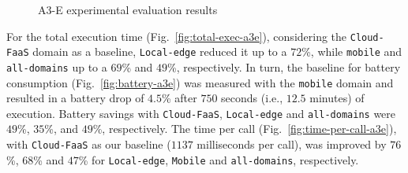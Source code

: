 \begin{figure}[htb]
	\centering
	\captionsetup[subfigure]{width=0.32\textwidth}	
		\captionsetup[subfigure]{width=0.32\textwidth}
	\captionsetup[subfigure]{width=0.32\textwidth}	
	\caption{A3-E experimental evaluation results} \label{fig:exp-a3e}
\end{figure}


For the total execution time (Fig.~\ref{fig:total-exec-a3e}), considering the \texttt{Cloud-FaaS} domain as a baseline, \texttt{Local-edge} reduced it up to a $72$\%, while \texttt{mobile} and \texttt{all-domains} up to a $69$\% and $49$\%, respectively. In turn, the baseline for battery consumption (Fig.~\ref{fig:battery-a3e}) was measured with the \texttt{mobile} domain and resulted in a battery drop of $4.5$\% after $750$ seconds (i.e., $12.5$ minutes) of execution. Battery savings with \texttt{Cloud-FaaS}, \texttt{Local-edge} and \texttt{all-domains} were $49$\%, $35$\%, and $49$\%, respectively. The time per call (Fig.~\ref{fig:time-per-call-a3e}), with \texttt{Cloud-FaaS} as our baseline ($1137$ milliseconds per call), was improved by $76$\%, $68$\% and $47$\% for \texttt{Local-edge}, \texttt{Mobile} and \texttt{all-domains}, respectively. 

